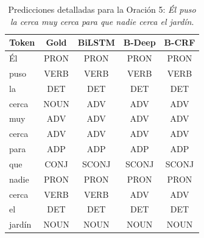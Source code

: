 \documentclass[12pt, a4paper]{article}
\begin{document}
\begin{table}[H]
    \centering
    \caption{Predicciones detalladas para la Oración 5: \textit{Él puso la cerca muy cerca para que nadie cerca el jardín}.}
    \label{tab:inf5_vert}
    \begin{tabular}{lcccc}
        \toprule
        \textbf{Token} & \textbf{Gold} & \textbf{BiLSTM} & \textbf{B-Deep} & \textbf{B-CRF} \\
        \midrule
        Él     & PRON & PRON & PRON  & PRON \\
        puso   & VERB & VERB & VERB  & VERB \\
        la     & DET  & DET & DET   & DET \\
        cerca  & NOUN & ADV & ADV   & ADV \\
        muy    & ADV  & ADV & ADV   & ADV \\
        cerca  & ADV  & ADV & ADV   & ADV \\
        para   & ADP  & ADP & ADP   & ADP \\
        que    & CONJ & SCONJ & SCONJ & SCONJ \\
        nadie  & PRON & PRON & PRON  & PRON \\
        cerca  & VERB & VERB & ADV   & ADV \\
        el     & DET  & DET & DET   & DET \\
        jardín & NOUN & NOUN & NOUN  & NOUN \\
        \bottomrule
    \end{tabular}
\end{table}
\end{document}
